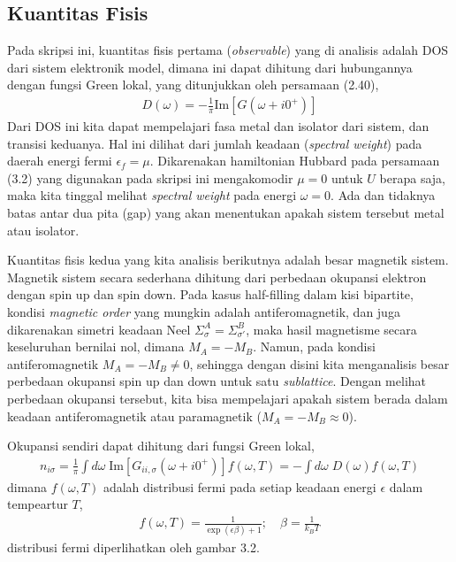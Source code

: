 \subsection{Kuantitas Fisis}

Pada skripsi ini, kuantitas fisis pertama (\textit{observable}) yang di analisis adalah DOS dari sistem elektronik model, dimana ini dapat dihitung dari hubungannya dengan fungsi Green lokal, yang ditunjukkan oleh persamaan (2.40),
\begin{align}
D(\omega) = - \frac{1}{\pi} \text{Im} [G(\omega + i0^+)]
\end{align}
Dari DOS ini kita dapat mempelajari fasa metal dan isolator dari sistem, dan transisi keduanya. Hal ini dilihat dari jumlah keadaan (\textit{spectral weight}) pada daerah energi fermi $\epsilon_f = \mu$. Dikarenakan hamiltonian Hubbard pada persamaan (3.2) yang digunakan pada skripsi ini mengakomodir $\mu =0$ untuk $U$ berapa saja, maka kita tinggal melihat \textit{spectral weight} pada energi $\omega = 0$. Ada dan tidaknya batas antar dua pita (gap) yang akan menentukan apakah sistem tersebut metal atau isolator.

Kuantitas fisis kedua yang kita analisis berikutnya adalah besar magnetik sistem. Magnetik sistem secara sederhana dihitung dari perbedaan okupansi elektron dengan spin up dan spin down. Pada kasus half-filling dalam kisi bipartite, kondisi \textit{magnetic order} yang mungkin adalah antiferomagnetik, dan juga dikarenakan simetri keadaan Neel $\Sigma^A_\sigma = \Sigma^B_{\sigma'}$, maka hasil magnetisme secara keseluruhan bernilai nol, dimana $M_A = - M_B$. Namun, pada kondisi antiferomagnetik $M_A = - M_B \neq 0$, sehingga dengan disini kita menganalisis besar perbedaan okupansi spin up dan down untuk satu \textit{sublattice}. Dengan melihat perbedaan okupansi tersebut, kita bisa mempelajari apakah sistem berada dalam keadaan antiferomagnetik atau paramagnetik ($M_A = - M_B \approx 0$). 

Okupansi sendiri dapat dihitung dari fungsi Green lokal,
\begin{align}
n_{i\sigma} = \frac{1}{\pi} \int d\omega \;  \text{Im} [G_{ii,\sigma}(\omega + i0^+)] f(\omega,T) = - \int d\omega\; D(\omega) f(\omega,T)
\end{align}
dimana $f(\omega,T)$ adalah distribusi fermi pada setiap keadaan energi $\epsilon$ dalam tempeartur $T$,
\begin{align}
f(\omega,T) = \frac{1}{\exp(\epsilon\beta) + 1}; \quad \beta = \frac{1}{k_BT}
\end{align}
distribusi fermi diperlihatkan oleh gambar 3.2.

